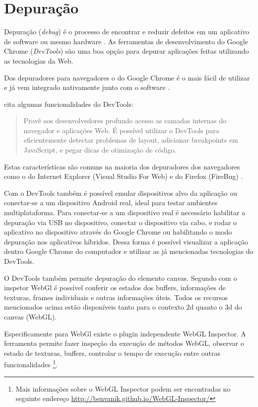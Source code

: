 \section{Depuração}

Depuração (\textit{debug}) é o processo de encontrar e reduzir defeitos
em um aplicativo de software ou mesmo hardware \autocite{depuracao}.
As ferramentas de desenvolvimento do Google Chrome (\textit{DevTools})
são uma boa opção para depurar aplicações feitas utilizando as
tecnologias da Web.

Dos depuradores para navegadores o do Google Chrome é o mais fácil
de utilizar e já vem integrado nativamente junto com o software
\autocite{gamesDebug}.

\citet{chromeDevTools} cita algumas funcionalidades do DevTools:
\begin{quote}
Provê aos desenvolvedores profundo acesso as camadas internas do
navegador e aplicações Web. É possível utilizar o DevTools
para eficientemente detectar problemas de layout, adicionar
breakpoints em JavaScript, e pegar dicas de otimização de código.
\end{quote}

Estas características são comuns na maioria dos depuradores dos
navegadores como o do Internet Explorer (Visual Studio For Web) e do
Firefox (FireBug) \autocite{gamesDebug}.

Com o DevTools também é possível emular dispositivos alvo da
aplicação ou conectar-se a um dispositivo Android real, ideal para
testar ambientes multiplataforma. Para conectar-se a um dispositivo real
é necessário habilitar a depuração via USB no dispositivo, conectar
o dispositivo via cabo, e rodar o aplicativo no dispositivo através
do Google Chrome ou habilitando o modo depuração nos aplicativos
híbridos. Dessa forma é possível visualizar a aplicação dentro
Google Chrome do computador e utilizar as já mencionadas tecnologias do
DevTools.

O DevTools também permite depuração do elemento canvas. Segundo
\citet{html5mostwanted} com o inspetor WebGl é possível conferir os
estados dos buffers, informações de texturas, frames individuais e
outras informações úteis. Todos os recursos mencionados acima estão
disponíveis tanto para o contexto 2d quanto o 3d do canvas (WebGL).

Especificamente para WebGl existe o plugin independente WebGL Inspector.
A ferramenta permite fazer inspeção da execução de métodos
WebGL, observar o estado de texturas, buffers, controlar o tempo de
execução entre outras funcionalidades \footnote{Mais informações
sobre o WebGL Inspector podem ser encontradas no seguinte endereço
\url{http://benvanik.github.io/WebGL-Inspector/}}.

